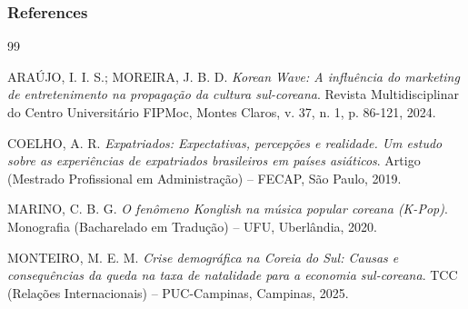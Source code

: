 \documentclass{beamer}
\begin{document}
\begin{frame}[allowframebreaks]
    \frametitle{References}
    
    \footnotesize 
    
    \begin{thebibliography}{99}
    
    ARAÚJO, I. I. S.; MOREIRA, J. B. D.
    \newblock \textit{Korean Wave: A influência do marketing de entretenimento na propagação da cultura sul-coreana}.
    \newblock Revista Multidisciplinar do Centro Universitário FIPMoc, Montes Claros, v. 37, n. 1, p. 86-121, 2024.
    
    COELHO, A. R.
    \newblock \textit{Expatriados: Expectativas, percepções e realidade. Um estudo sobre as experiências de expatriados brasileiros em países asiáticos}.
    \newblock Artigo (Mestrado Profissional em Administração) – FECAP, São Paulo, 2019.
    
    MARINO, C. B. G.
    \newblock \textit{O fenômeno Konglish na música popular coreana (K-Pop)}.
    \newblock Monografia (Bacharelado em Tradução) – UFU, Uberlândia, 2020.
    
    MONTEIRO, M. E. M.
    \newblock \textit{Crise demográfica na Coreia do Sul: Causas e consequências da queda na taxa de natalidade para a economia sul-coreana}.
    \newblock TCC (Relações Internacionais) – PUC-Campinas, Campinas, 2025.
    
    \end{thebibliography}
\end{frame}
\end{document}
